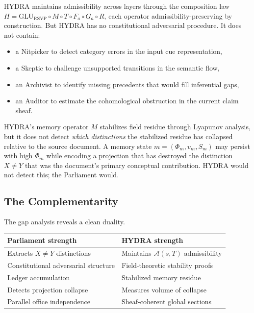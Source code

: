 \documentclass[12pt, a4paper]{article}
\theoremstyle{plain}
\theoremstyle{definition}
\theoremstyle{remark}
\begin{document}
HYDRA maintains admissibility across layers through the composition law
$H = \mathrm{GLU}_\mathrm{RSVP} \circ M \circ T \circ F_a \circ G_a \circ R$, each operator
admissibility-preserving by construction. But HYDRA has no constitutional
adversarial procedure. It does not contain:
\begin{itemize}
\item a Nitpicker to detect category errors in the input cue representation,
\item a Skeptic to challenge unsupported transitions in the semantic flow,
\item an Archivist to identify missing precedents that would fill inferential gaps,
\item an Auditor to estimate the cohomological obstruction in the current claim sheaf.
\end{itemize}

HYDRA's memory operator $M$ stabilizes field residue through Lyapunov analysis,
but it does not detect \emph{which distinctions} the stabilized residue has
collapsed relative to the source document. A memory state $m = (\Phi_m, v_m, S_m)$
may persist with high $\Phi_m$ while encoding a projection that has destroyed
the distinction $X \neq Y$ that was the document's primary conceptual
contribution. HYDRA would not detect this; the Parliament would.

\subsection{The Complementarity}

The gap analysis reveals a clean duality.

\begin{center}
\renewcommand{\arraystretch}{1.4}
\begin{tabular}{p{4.5cm} p{4.5cm}}
\toprule
\textbf{Parliament strength} & \textbf{HYDRA strength} \\
\midrule
Extracts $X \neq Y$ distinctions & Maintains $\mathcal{A}(s,T)$ admissibility \\
Constitutional adversarial structure & Field-theoretic stability proofs \\
Ledger accumulation & Stabilized memory residue \\
Detects projection collapse & Measures volume of collapse \\
Parallel office independence & Sheaf-coherent global sections \\
\bottomrule
\end{tabular}
\end{center}
\end{document}
